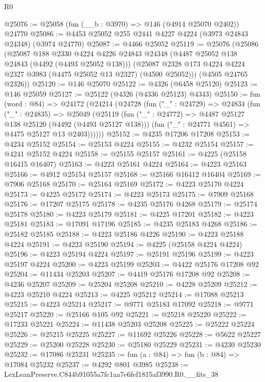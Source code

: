 \begin{lexlean}{R0}
\begin{coremodule}
@25076 := @25058 (fun (__b : @3970) => @146 (@4914 @25070 @2402)) @24770
@25086 := @4453 @25052 @255 @2441 @4227 @4224 (@3973 @24843 @24348) (@3974 @24770)
@25087 := @4466 @25052
@25119 := @25076
    (@25086
      (@25087
        @188
        @2330
        @4224
        @4226
        @24843
        @24348
        (@4487 @25052 @138 @24843 (@4492 (@4493 @25052 @138)))
        (@25087 @2328 @173 @4224 @4224 @2327 @3983 (@4475 @25052 @13 @2327) (@4500 @25052)))
      (@4505 @24765 @2326))
@25120 := @146 @25070
@25122 := @4326 (@6458 @25120)
@25123 := @146 @25059
@25127 := @25122 (@4326 (@4336 @25123) @4343)
@25150 := fun (word : @84) =>
  @24172
    (@24214
      (@24728
        (fun ("_" : @24729) =>
        @24834
          (fun ("_" : @24835) =>
          @25049
            (@25119
              (fun ("_" : @24772) => @4487 @25127 @138 @25120 (@4492 (@4493 @25127 @138)))
              (fun ("_" : @24771 @4561) => @4475 @25127 @13 @2403))))))
@25152 := @4235 @17206 @17208
@25153 := @4234 @25152
@25154 := @25153 @4224
@25155 := @4232 @25154
@25157 := @4241 @25152 @4224
@25158 := @25155 @25157
@25161 := @4225 (@25158 @16415 @16407)
@25163 := @4223 @25161 @4224
@25164 := @4223 @25163
@25166 := @4912 @25154 @25157
@25168 := @25166 @16412 @16404
@25169 := @7906 @25168
@25170 := @25164 @25169
@25172 := @4223 @25170 @4224
@25173 := @4225 @25172
@25174 := @4223 @25173
@25175 := @7909 @25168
@25176 := @17207 @25175
@25178 := @4235 @25176 @4268
@25179 := @25174 @25178
@25180 := @4223 @25179
@25181 := @4225 @17201
@25182 := @4223 @25181
@25183 := @17091 @17196
@25185 := @4235 @25183 @4268
@25186 := @25182 @25185
@25188 := @4223 @25186 @4226
@25190 := @4223 @25188 @4224
@25191 := @4223 @25190
@25194 := @4225 (@25158 @4224 @4224)
@25196 := @4223 @25194 @4224
@25197 := @25191 @25196
@25199 := @4223 @25197 @4224
@25200 := @4223 @25199
@25203 := @4422 @25176 @17208 @92
@25204 := @11434 @25203
@25207 := @4419 @25176 @17208 @92
@25208 := @4236 @25207
@25209 := @25204 @25208
@25210 := @4228 @25209
@25212 := @4223 @25210 @4224
@25213 := @4225 @25212
@25214 := @17088 @25213
@25215 := @4223 @25214
@25217 := @9771 @25183 @17092
@25218 := @9771 @25217
@25220 := @25166 @105 @92
@25221 := @25218 @25220
@25222 := @17233 @25221
@25224 := @11438 @25203 @25208
@25225 := @25222 @25224
@25226 := @25215 @25225
@25227 := @11692 @25226
@25228 := @5622 @25227
@25229 := @25200 @25228
@25230 := @25180 @25229
@25231 := @4230 @25230
@25232 := @17086 @25231
@25235 := fun (a : @84) => fun (b : @84) => @17084 @25232
@25237 := @4292 @801 @3985
@25238 := LexLeanPreserve.C844b91055a7fc1aa7e6fef1815af3990.R0.__fits_38

\end{coremodule}
\end{lexlean}
